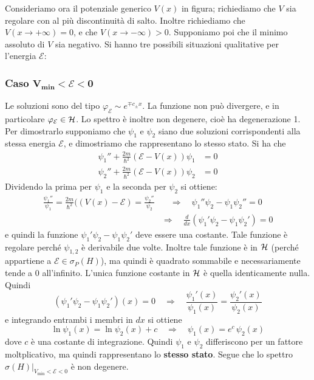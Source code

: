 \documentclass[../../FisicaTeorica.tex]{subfiles}
\begin{document}
Consideriamo ora il potenziale generico $V(x)$ in figura; richiediamo che $V$ sia regolare con al più discontinuità di salto. Inoltre richiediamo che $V(x\to + \infty)=0$, e che $V(x\to-\infty) > 0$. Supponiamo poi che il minimo assoluto di $V$ sia negativo. Si hanno tre possibili situazioni qualitative per l'energia $\mathcal E$:




\subsubsection{Caso $\bm{V_{\text{min}} < \mathcal{E} < 0}$}
Le soluzioni sono del tipo $\varphi_\mathcal{E}\sim e^{\mp c_\pm x}$. La funzione non può divergere, e in particolare $\varphi_\mathcal{E}\in \mathcal{H}$. Lo spettro è inoltre non degenere, cioè ha degenerazione 1. Per dimostrarlo supponiamo che $\psi_1$ e $\psi_2$ siano due soluzioni corrispondenti alla stessa energia $\mathcal{E}$, e dimostriamo che rappresentano lo stesso stato. Si ha che
\begin{align*}
\psi_1'' + \frac{2m}{\hbar^2}(\mathcal{E}-V(x))\psi_1 &= 0\\[0.6em]
\psi_2'' + \frac{2m}{\hbar^2}(\mathcal{E}-V(x))\psi_2 &= 0
\end{align*}
Dividendo la prima per $\psi_1$ e la seconda per $\psi_2$ si ottiene:
\begin{align*}
\frac{\psi_1''}{\psi_1}=\frac{2m}{\hbar^2}((V(x)-\mathcal{E})=\frac{\psi_2''}{\psi_2} & \quad \Rightarrow \quad \psi_1''\psi_2 - \psi_1\psi_2'' = 0\\
& \Rightarrow \quad \frac{d}{dx}(\psi_1' \psi_2 - \psi_1 \psi_2') = 0
\end{align*}
e quindi la funzione $\psi_1'\psi_2 - \psi_1 \psi_2'$ deve essere una costante. Tale funzione è regolare perché $\psi_{1,2}$ è derivabile due volte. Inoltre tale funzione è in $\mathcal{H}$ (perché appartiene a $\mathcal{E}\in \sigma_P(H)$), ma quindi è quadrato sommabile e necessariamente tende a 0 all'infinito. L'unica funzione costante in $\mathcal{H}$ è quella identicamente nulla. Quindi
\[
(\psi_1' \psi_2 - \psi_1 \psi_2')(x) = 0 \quad \Rightarrow \quad \frac{\psi_1'(x)}{\psi_1(x)} = \frac{\psi_2'(x)}{\psi_2(x)}
\]
e integrando entrambi i membri in $dx$ si ottiene
\[
\ln \psi_1(x) = \ln \psi_2(x) + c \quad
\Rightarrow \quad \psi_1(x) = e^{c} \, \psi_2(x)
\]
dove $c$ è una costante di integrazione. Quindi $\psi_1$ e $\psi_2$ differiscono per un fattore moltplicativo, ma quindi rappresentano lo \textbf{stesso stato}.
Segue che lo spettro  $\sigma(H)|_{V_\text{min} < \mathcal{E} < 0}$ è non degenere.
\end{document}
